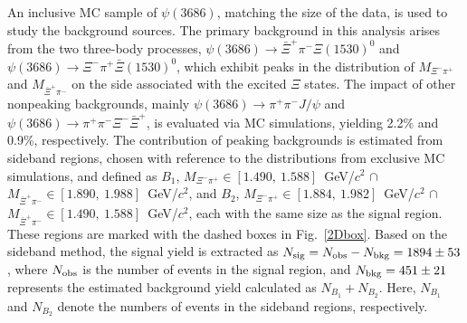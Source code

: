 \documentclass[prd,aps,reprint,noeprint,superscriptaddress,amsmath, amssymb]{revtex4-1}
\begin{document}
An inclusive MC sample of $\psi(3686)$, matching the size of the data, is used to study the background sources. The primary background in this analysis arises from the two three-body processes, $\psi(3686)\to \bar\Xi^+\pi^-\Xi(1530)^0$ and $\psi(3686)\to \Xi^-\pi^+\bar\Xi(1530)^0$, which exhibit peaks in the distribution of $M_{\Xi^-\pi^+}$ and $M_{\bar\Xi^+\pi^-}$ on the side associated with the excited $\Xi$ states.
The impact of other nonpeaking backgrounds, mainly $\psi(3686)\to\pi^+\pi^-J/\psi$ and $\psi(3686)\to\pi^+\pi^-\Xi^-\bar\Xi^+$, is evaluated via MC simulations, yielding 2.2\% and 0.9\%, respectively.
The contribution of peaking backgrounds is estimated from sideband regions, chosen with reference to the distributions from exclusive MC simulations, and defined as
$B_1$, $M_{\Xi^-\pi^+} \in [1.490,~1.588]$~GeV/$c^2$ $\cap$ $M_{\bar\Xi^+\pi^-} \in [1.890,~1.988]$~GeV/$c^2$, and $B_2$, $M_{\Xi^-\pi^+} \in [1.884,~1.982]$~GeV/$c^2$ $\cap$ $M_{\bar\Xi^+\pi^-} \in [1.490,~1.588]$~GeV/$c^2$, each with the same size as the signal region. These regions are marked with the dashed boxes in Fig.~\ref{2Dbox}.
Based on the sideband method, the signal yield is extracted as $N_{\rm sig} = N_{\rm obs} - N_{\rm bkg} = 1894\pm53$, where $N_{\rm obs}$ is the number of events in the signal region, and $N_{\rm bkg}=451\pm21$ represents the estimated background yield calculated as $N_{B_1} + N_{B_2}$. Here, $N_{B_1}$ and $N_{B_2}$ denote the numbers of events in the sideband regions, respectively.
\end{document}
